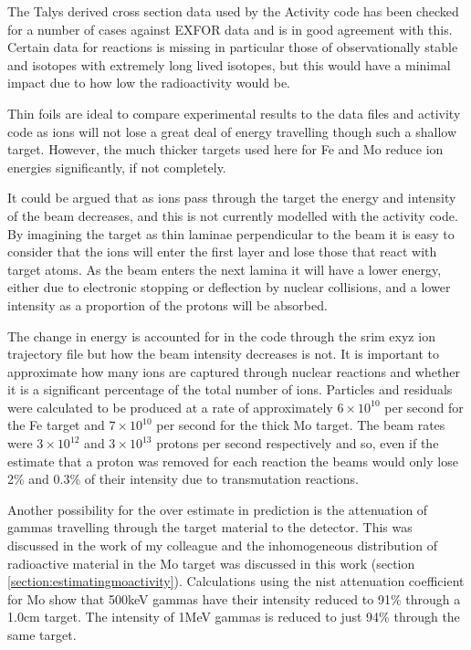 The Talys derived cross section data used by the Activity code has been checked for a number of cases against EXFOR data and is in good agreement with this.  Certain data for reactions is missing in particular those of observationally stable and isotopes with extremely long lived isotopes, but this would have a minimal impact due to how low the radioactivity would be.

Thin foils are ideal to compare experimental results to the data files and activity code as ions will not lose a great deal of energy travelling though such a shallow target.  However, the much thicker targets used here for Fe and Mo reduce ion energies significantly, if not completely.

It could be argued that as ions pass through the target the energy and intensity of the beam decreases, and this is not currently modelled with the activity code.  By imagining the target as thin laminae perpendicular to the beam it is easy to consider that the ions will enter the first layer and lose those that react with target atoms.  As the beam enters the next lamina it will have a lower energy, either due to electronic stopping or deflection by nuclear collisions, and a lower intensity as a proportion of the protons will be absorbed.

The change in energy is accounted for in the code through the \acrshort{srim} exyz ion trajectory file but how the beam intensity decreases is not.  It is important to approximate how many ions are captured through nuclear reactions and whether it is a significant percentage of the total number of ions.  Particles and residuals were calculated to be produced at a rate of approximately $6\times10^{10}$ per second for the Fe target and $7\times10^{10}$ per second for the thick Mo target.  The beam rates were $3 \times 10^{12}$ and $3 \times 10^{13}$ protons per second respectively and so, even if the estimate that a proton was removed for each reaction the beams would only lose 2\% and 0.3\% of their intensity due to transmutation reactions.

Another possibility for the over estimate in prediction is the attenuation of gammas travelling through the target material to the detector.  This was discussed in the work of my colleague\cite{johnhewett} and the inhomogeneous distribution of radioactive material in the Mo target was discussed in this work (section \ref{section:estimatingmoactivity}).  Calculations using the \acrshort{nist} attenuation coefficient for Mo show that 500keV gammas have their intensity reduced to 91\% through a 1.0cm target.  The intensity of 1MeV gammas is reduced to just 94\% through the same target.

